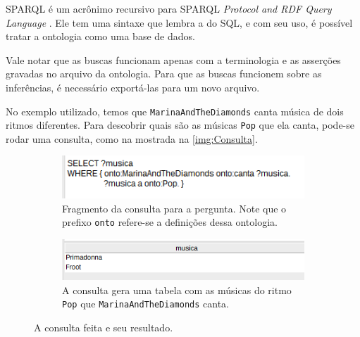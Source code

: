 SPARQL é um acrônimo recursivo para SPARQL \textit{Protocol and RDF Query Language}  \citep{ferramentasSPARQL}. Ele tem uma sintaxe que lembra a do SQL, e com seu uso, é possível tratar a ontologia como uma base de dados.  

Vale notar que as buscas funcionam apenas com a terminologia e as asserções gravadas no arquivo da ontologia. Para que as buscas funcionem sobre as inferências, é necessário exportá-las para um novo arquivo.

No exemplo utilizado, temos que \texttt{MarinaAndTheDiamonds} canta música de dois ritmos diferentes. Para descobrir quais são as músicas \texttt{Pop} que ela canta, pode-se rodar uma consulta, como na mostrada na \autoref{img:Consulta}.

\begin{figure}
	\centering
	\begin{subfigure}{.7\textwidth}
		\centering
		\includegraphics[width=0.95\linewidth]{Capitulos/Ferramentas/query}
		\caption{Fragmento da consulta para a pergunta. Note que o prefixo \texttt{onto} refere-se a definições dessa ontologia.}
	\end{subfigure}
	\begin{subfigure}{.7\textwidth}
		\centering
		\includegraphics[width=0.95\linewidth]{Capitulos/Ferramentas/resultado}
		\caption{A consulta gera uma tabela com as músicas do ritmo \texttt{Pop} que \texttt{MarinaAndTheDiamonds} canta.}
	\end{subfigure}
	\caption{A consulta feita e seu resultado.}
	\label{img:Consulta}
\end{figure}